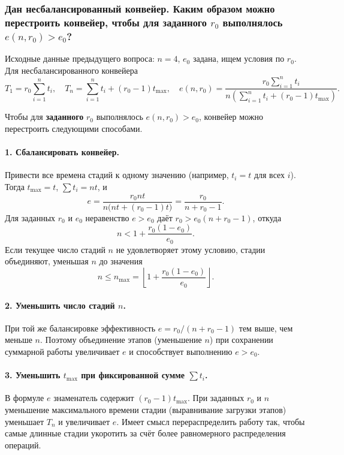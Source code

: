 \subsubsection*{Дан несбалансированный конвейер. Каким образом можно перестроить конвейер, чтобы для заданного $r_0$ выполнялось $e(n, r_0) > e_0$?}

Исходные данные предыдущего вопроса: $n = 4$, $e_0$ задана, ищем условия по $r_0$. Для несбалансированного конвейера
\[
T_1 = r_0 \sum_{i=1}^{n} t_i, \quad T_n = \sum_{i=1}^{n} t_i + (r_0 - 1) t_{\max}, \quad e(n, r_0) = \frac{r_0 \sum_{i=1}^{n} t_i}{n \left( \sum_{i=1}^{n} t_i + (r_0 - 1) t_{\max} \right)}.
\]

Чтобы для \textbf{заданного} $r_0$ выполнялось $e(n, r_0) > e_0$, конвейер можно перестроить следующими способами.

\paragraph{1. Сбалансировать конвейер.}
Привести все времена стадий к одному значению (например, $t_i = t$ для всех $i$). Тогда $t_{\max} = t$, $\sum t_i = n t$, и
\[
e = \frac{r_0 n t}{n \bigl( n t + (r_0 - 1) t \bigr)} = \frac{r_0}{n + r_0 - 1}.
\]
Для заданных $r_0$ и $e_0$ неравенство $e > e_0$ даёт $r_0 > e_0(n + r_0 - 1)$, откуда
\[
n < 1 + \frac{r_0(1 - e_0)}{e_0}.
\]
Если текущее число стадий $n$ не удовлетворяет этому условию, стадии объединяют, уменьшая $n$ до значения
\[
n \leq n_{\max} = \left\lfloor 1 + \frac{r_0(1 - e_0)}{e_0} \right\rfloor.
\]

\paragraph{2. Уменьшить число стадий $n$.}
При той же балансировке эффективность $e = r_0/(n + r_0 - 1)$ тем выше, чем меньше $n$. Поэтому объединение этапов (уменьшение $n$) при сохранении суммарной работы увеличивает $e$ и способствует выполнению $e > e_0$.

\paragraph{3. Уменьшить $t_{\max}$ при фиксированной сумме $\sum t_i$.}
В формуле $e$ знаменатель содержит $(r_0 - 1) t_{\max}$. При заданных $r_0$ и $n$ уменьшение максимального времени стадии (выравнивание загрузки этапов) уменьшает $T_n$ и увеличивает $e$. Имеет смысл перераспределить работу так, чтобы самые длинные стадии укоротить за счёт более равномерного распределения операций.

